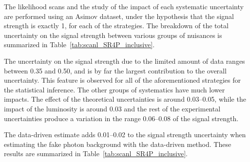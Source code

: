 \label{sec:unblinded_4L_inclusive}

The likelihood scans and the study of the impact of each systematic uncertainty are performed
using an Asimov dataset, under the hypothesis that the signal strength is exactly 1,
for each of the strategies.
The breakdown of the total uncertainty on the signal strength between various groups of nuisances is
summarized in Table~\ref{tab:scanl_SR4P_inclusive}.

The uncertainty on the signal strength due to the limited amount of data ranges between 0.35 and 0.50,
and is by far the largest contribution to the overall uncertainty.
This feature is observed for all of the aforementioned strategies for the statistical inference.
The other groups of systematics have much lower impacts.
The effect of the theoretical uncertainties is around 0.03--0.05,
while the impact of the luminosity is around 0.03
and the rest of the experimental uncertainties produce a variation in the range 0.06--0.08 of the signal strength.

The data-driven estimate %
adds 0.01--0.02 to the signal strength uncertainty when estimating the fake photon background
with the data-driven method. %
These results are summarized in Table~\ref{tab:scanl_SR4P_inclusive}.

